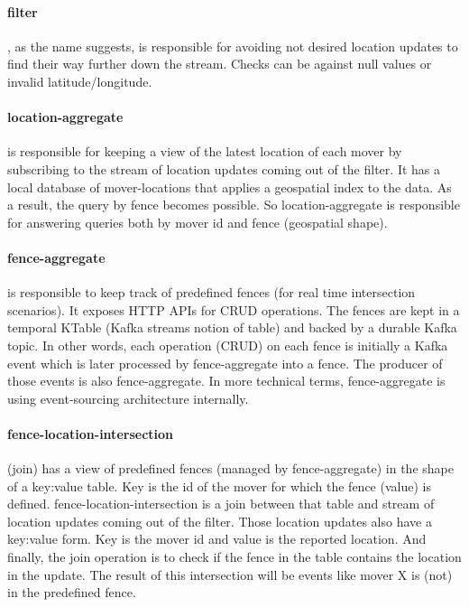 \documentclass[a4]{report}
\begin{document}
    \paragraph{filter}, as the name suggests, is responsible for avoiding not desired location updates to find their
    way further down the stream.
    Checks can be against null values or invalid latitude/longitude.

    \paragraph{location-aggregate} is responsible for keeping a view of the latest location of each mover by
    subscribing to the stream of location updates coming out of the filter.
    It has a local database of mover-locations that applies a geospatial index to the data.
    As a result, the query by fence becomes possible.
    So location-aggregate is responsible for answering queries both by mover id and fence (geospatial shape).

    \paragraph{fence-aggregate} is responsible to keep track of predefined fences (for real time intersection scenarios).
    It exposes HTTP APIs for CRUD operations.
    The fences are kept in a temporal KTable (Kafka streams notion of table) and backed by a durable Kafka topic.
    In other words, each operation (CRUD) on each fence is initially a Kafka event which is later processed by fence-aggregate into a fence.
    The producer of those events is also fence-aggregate.
    In more technical terms, fence-aggregate is using event-sourcing architecture internally.

    \paragraph{fence-location-intersection} (join) has a view of predefined fences (managed by fence-aggregate) in
    the shape of a key:value table.
    Key is the id of the mover for which the fence (value) is defined.
    fence-location-intersection is a join between that table and stream of location updates coming out of the filter.
    Those location updates also have a key:value form.
    Key is the mover id and value is the reported location.
    And finally, the join operation is to check if the fence in the table contains the location in the update.
    The result of this intersection will be events like mover X is (not) in the predefined fence.
\end{document}
